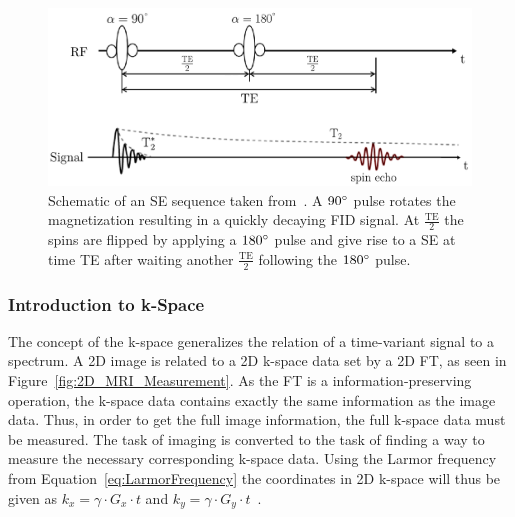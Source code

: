 \begin{figure}[h] %
	\centering
	\includegraphics[width=\linewidth]{./Images/SpinEcho.pdf} 
	\caption{Schematic of an SE sequence taken from~\cite{PulseSequences}. A $90 \degree$ pulse rotates the magnetization resulting in a quickly decaying FID signal. At $\frac{\text{TE}}{2}$ the spins are flipped by applying a $180 \degree$ pulse and give rise to a SE at time TE after waiting another $\frac{\text{TE}}{2}$ following the $180 \degree$ pulse.}
	\label{fig:SpinEcho}
\end{figure}


\subsubsection{Introduction to k-Space}
The concept of the k-space generalizes the relation of a time-variant signal to a spectrum. A 2D image is related to a 2D k-space data set by a 2D FT, as seen in Figure~\ref{fig:2D_MRI_Measurement}. As the FT is a information-preserving operation, the k-space data contains exactly the same information as the image data. Thus, in order to get the full image information, the full k-space data must be measured. The task of imaging is converted to the task of finding a way to measure the necessary corresponding k-space data. Using the Larmor frequency from Equation~\ref{eq:LarmorFrequency} the coordinates in 2D k-space will thus be given as $k_x = \gamma \cdot G_x \cdot t$ and $k_y = \gamma \cdot G_y \cdot t$~\cite{SamplingStrategies}. 

